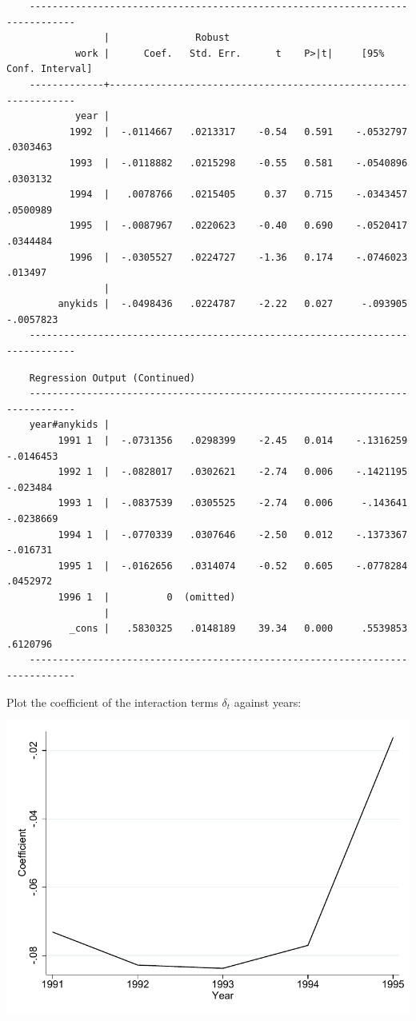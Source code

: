 \documentclass{article}
\begin{document}
\begin{enumerate}
    \begin{verbatim}
    ------------------------------------------------------------------------------
                 |               Robust
            work |      Coef.   Std. Err.      t    P>|t|     [95% Conf. Interval]
    -------------+----------------------------------------------------------------
            year |
           1992  |  -.0114667   .0213317    -0.54   0.591    -.0532797    .0303463
           1993  |  -.0118882   .0215298    -0.55   0.581    -.0540896    .0303132
           1994  |   .0078766   .0215405     0.37   0.715    -.0343457    .0500989
           1995  |  -.0087967   .0220623    -0.40   0.690    -.0520417    .0344484
           1996  |  -.0305527   .0224727    -1.36   0.174    -.0746023     .013497
                 |
         anykids |  -.0498436   .0224787    -2.22   0.027     -.093905   -.0057823
    ------------------------------------------------------------------------------
    \end{verbatim}
    \begin{verbatim}
    Regression Output (Continued)
    ------------------------------------------------------------------------------
    year#anykids |
         1991 1  |  -.0731356   .0298399    -2.45   0.014    -.1316259   -.0146453
         1992 1  |  -.0828017   .0302621    -2.74   0.006    -.1421195    -.023484
         1993 1  |  -.0837539   .0305525    -2.74   0.006     -.143641   -.0238669
         1994 1  |  -.0770339   .0307646    -2.50   0.012    -.1373367    -.016731
         1995 1  |  -.0162656   .0314074    -0.52   0.605    -.0778284    .0452972
         1996 1  |          0  (omitted)
                 |
           _cons |   .5830325   .0148189    39.34   0.000     .5539853    .6120796
    ------------------------------------------------------------------------------
    \end{verbatim}

Plot the coefficient of the interaction terms $\delta_t$ against years:

\includegraphics[scale=0.9]{Graph2.pdf}


\end{enumerate}
\end{document}
